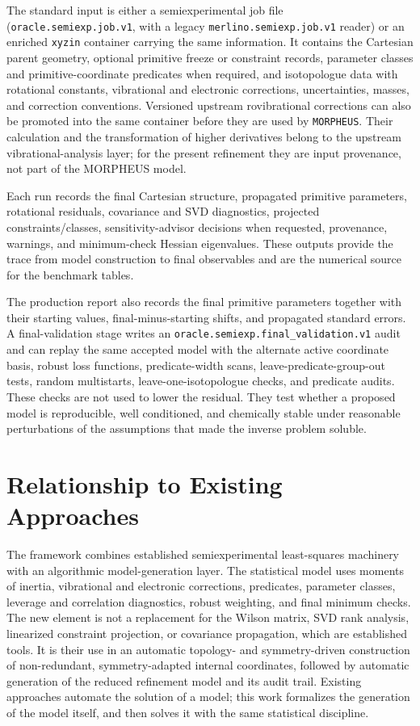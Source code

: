 \documentclass[aip,jcp,reprint,longbibliography,floatfix]{revtex4-2}
\begin{document}
The standard input is either a semiexperimental job file
(\texttt{oracle.semiexp.job.v1}, with a legacy
\texttt{merlino.semiexp.job.v1} reader) or an enriched \texttt{xyzin}
container carrying the same information. It contains the Cartesian parent
geometry, optional primitive freeze or constraint records, parameter classes
and primitive-coordinate predicates when required, and isotopologue data with
rotational constants, vibrational and electronic corrections, uncertainties,
masses, and correction conventions. Versioned upstream rovibrational
corrections can also be promoted into the same container before they are used
by \texttt{MORPHEUS}. Their calculation and the transformation of higher
derivatives belong to the upstream vibrational-analysis layer; for the present
refinement they are input provenance, not part of the MORPHEUS model.

Each run records the final Cartesian structure, propagated primitive
parameters, rotational residuals, covariance and SVD diagnostics, projected
constraints/classes, sensitivity-advisor decisions when requested, provenance,
warnings, and minimum-check Hessian eigenvalues. These outputs provide the
trace from model construction to final observables and are the numerical
source for the benchmark tables.

The production report also records the final primitive parameters together
with their starting values, final-minus-starting shifts, and propagated
standard errors. A final-validation stage writes an
\texttt{oracle.semiexp.final\_validation.v1} audit and can replay the same
accepted model with the alternate active coordinate basis, robust loss
functions, predicate-width scans, leave-predicate-group-out tests, random
multistarts, leave-one-isotopologue checks, and predicate audits. These checks
are not used to lower the residual. They test whether a proposed model is
reproducible, well conditioned, and chemically stable under reasonable
perturbations of the assumptions that made the inverse problem soluble.


\section{Relationship to Existing Approaches}

The framework combines established semiexperimental least-squares
machinery\cite{Demaison2011EquilibriumStructures,Mendolicchio2017MSR,Bartell1975Predicate,Mendolicchio2025FastDvib}
with an algorithmic model-generation layer. The statistical model
uses moments of inertia, vibrational and electronic corrections, predicates,
parameter classes, leverage and correlation diagnostics, robust weighting, and
final minimum checks. The new element is not a replacement for the Wilson
matrix, SVD rank analysis, linearized constraint projection, or covariance
propagation, which are established tools. It is their use in an automatic
topology- and symmetry-driven construction of non-redundant, symmetry-adapted
internal coordinates, followed by automatic generation of the reduced
refinement model and its audit trail. Existing approaches automate the solution
of a model; this work formalizes the generation of the model itself, and then
solves it with the same statistical discipline.
\end{document}
